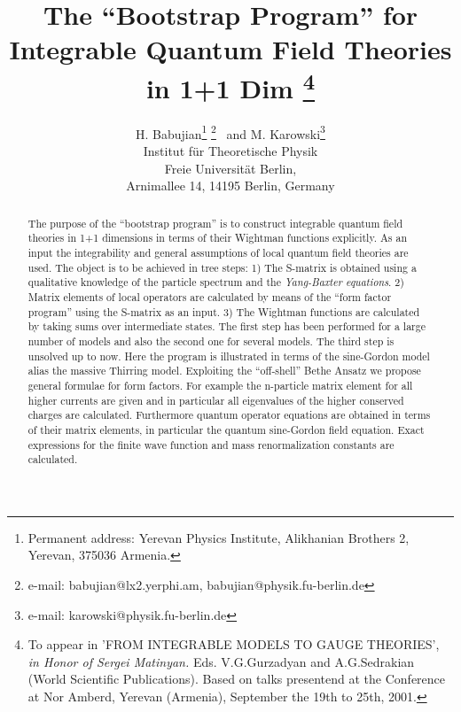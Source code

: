 \documentclass[a4paper,12pt]{article}
\begin{document}
\title{The ``Bootstrap Program'' for Integrable Quantum Field Theories in 
1+1 Dim
\footnote{To appear in
'FROM INTEGRABLE MODELS TO GAUGE THEORIES',
{\em in Honor of Sergei Matinyan.}
Eds. V.G.Gurzadyan and A.G.Sedrakian
(World Scientific Publications).
Based on talks presentend at the Conference 
at Nor Amberd, Yerevan (Armenia), September the 19th to 25th, 2001.}
}

\author{H. Babujian\thanks{%
Permanent address: Yerevan Physics Institute, Alikhanian Brothers 2,
Yerevan, 375036 Armenia.} \thanks{
e-mail: babujian@lx2.yerphi.am, babujian@physik.fu-berlin.de}~ and M.
Karowski\thanks{
e-mail: karowski@physik.fu-berlin.de} \\
Institut f\"ur Theoretische Physik\\
Freie Universit\"at Berlin,\\
Arnimallee 14, 14195 Berlin, Germany}

\maketitle

\begin{abstract}
The purpose of the ``bootstrap program'' is to construct
integrable quantum field theories in 1+1 dimensions in terms of their
Wightman functions explicitly. As an input the integrability and general
assumptions of local quantum field theories are used. The object is to be
achieved in tree steps: 1) The S-matrix is obtained using a qualitative
knowledge of the particle spectrum and the \emph{Yang-Baxter equations}. 2)
Matrix elements of local operators are calculated by means of the ``form
factor program'' using the S-matrix as an input. 3) The Wightman functions
are calculated by taking sums over intermediate states. The first step has
been performed for a large number of models and also the second one for
several models. The third step is unsolved up to now. Here the program is
illustrated in terms of the sine-Gordon model alias the massive Thirring
model. Exploiting the ``off-shell'' Bethe Ansatz we propose general formulae
for form factors. For example the n-particle matrix element for all higher
currents are given and in particular all eigenvalues of the higher conserved
charges are calculated. Furthermore quantum operator equations are obtained
in terms of their matrix elements, in particular the quantum sine-Gordon
field equation. Exact expressions for the finite wave function and mass
renormalization constants are calculated.
\end{abstract}
\end{document}
